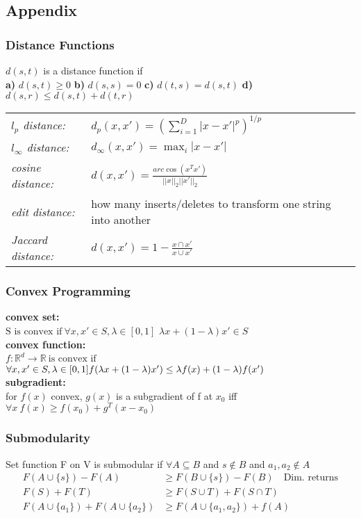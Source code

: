 \documentclass[10pt,parskip]{scrartcl}
\begin{document}
\begin{multicols*}{3}
\subsection{Appendix}
\subsubsection{Distance Functions} %
\label{ssub:distance_functions}
$d(s,t)$ is a distance function if \\
\textbf{a)} $d(s,t) \geq 0$ \textbf{b)} $d(s,s) = 0$ 
\textbf{c)} $d(t,s) = d(s,t)$ \textbf{d)} $d(s,r) \leq d(s,t) + d(t,r)$\\
	\begin{tabular} {l p{6cm}}
		\emph{$l_p$ distance:} & $d_p(x,x') = (\sum_{i=1}^D |x-x'|^p)^{1/p}$ \\
		\emph{$l_\infty$ distance:} & $d_\infty(x,x') = \max_i |x-x'|$ \\
		\emph{cosine distance:} & $d(x,x') = \frac{arc\cos(x^T x')}{||x||_2||x'||_2}$ \\
		\emph{edit distance:} & how many inserts/deletes to transform one string into another \\
		\emph{Jaccard distance: } & $d(x,x') =  1- \frac{x \cap x'}{x \cup x'}$ 
	\end{tabular}

\subsubsection{Convex Programming} %
\label{ssub:convex_programming}
\textbf{convex set:}\\
$\textrm{S is convex if} \ \forall x, x' \in S , \lambda \in [0,1]$
$\lambda x + (1- \lambda) x' \in S $ \\
\textbf{convex function:}\\
$f:\mathbb{R}^d \to \mathbb{R} \ \textrm{is convex if}$ \  
$\forall x, x' \in S , \lambda \in [0,1] \\
f(\lambda x + (1-\lambda)x') \leq \lambda f(x) + (1-\lambda) f(x')$ \\
\textbf{subgradient:}\\
for $f(x)$ convex, $g(x)$ is a subgradient of f at $x_0$ iff \\
$\forall x \ f(x) \geq f(x_0) + g^T(x-x_0)$

\subsubsection{Submodularity} %
\label{ssub:submodularity}
Set function F on V is submodular if $\forall A \subseteq B$ and $s \notin B$ and $a_1,a_2 \notin A$
\begin{align}
F(A \cup \{s\}) - F(A) &\geq F(B \cup \{s\}) - F(B) \quad \textrm{Dim. returns} \\
F(S) + F(T) &\geq F(S \cup T) + F(S \cap T) \\
F(A \cup \{a_1\}) + F(A \cup \{a_2\}) &\geq F(A \cup \{a_1,a_2\}) + f(A)
\end{align}


\end{multicols*}
\end{document}

